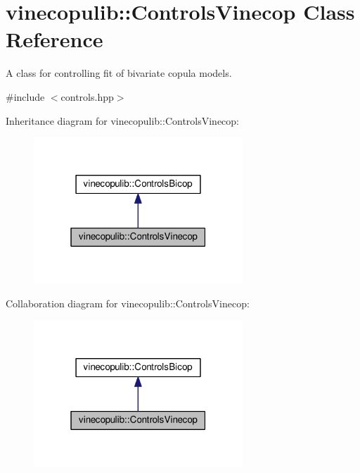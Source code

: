 \hypertarget{classvinecopulib_1_1_controls_vinecop}{}\section{vinecopulib\+:\+:Controls\+Vinecop Class Reference}
\label{classvinecopulib_1_1_controls_vinecop}


A class for controlling fit of bivariate copula models.  




{\ttfamily \#include $<$controls.\+hpp$>$}



Inheritance diagram for vinecopulib\+:\+:Controls\+Vinecop\+:\nopagebreak
\begin{figure}[H]
\begin{center}
\leavevmode
\includegraphics[width=223pt]{classvinecopulib_1_1_controls_vinecop__inherit__graph}
\end{center}
\end{figure}


Collaboration diagram for vinecopulib\+:\+:Controls\+Vinecop\+:\nopagebreak
\begin{figure}[H]
\begin{center}
\leavevmode
\includegraphics[width=223pt]{classvinecopulib_1_1_controls_vinecop__coll__graph}
\end{center}
\end{figure}
